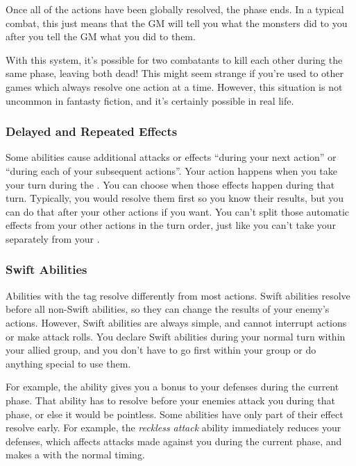     Once all of the actions have been globally resolved, the phase ends.
    In a typical combat, this just means that the GM will tell you what the monsters did to you after you tell the GM what you did to them.

    With this system, it's possible for two combatants to kill each other during the same phase, leaving both dead!
    This might seem strange if you're used to other games which always resolve one action at a time.
    However, this situation is not uncommon in fantasty fiction, and it's certainly possible in real life.

    \subsubsection{Delayed and Repeated Effects}
      Some abilities cause additional attacks or effects ``during your next action'' or ``during each of your subsequent actions''.
      Your action happens when you take your turn during the .
      You can choose when those effects happen during that turn.
      Typically, you would resolve them first so you know their results, but you can do that after your other actions if you want.
      You can't split those automatic effects from your other actions in the turn order, just like you can't take your  separately from your .

    \subsubsection{Swift Abilities}\label{Swift Abilities}
      Abilities with the  tag resolve differently from most actions.
      Swift abilities resolve before all non-Swift abilities, so they can change the results of your enemy's actions.
      However, Swift abilities are always simple, and cannot interrupt actions or make attack rolls.
      You declare Swift abilities during your normal turn within your allied group, and you don't have to go first within your group or do anything special to use them.

      For example, the  ability gives you a bonus to your defenses during the current phase.
      That ability has to resolve before your enemies attack you during that phase, or else it would be pointless.
      Some abilities have only part of their effect resolve early.
      For example, the \textit{reckless attack} ability immediately reduces your defenses, which affects attacks made against you during the current phase, and makes a  with the normal timing.

